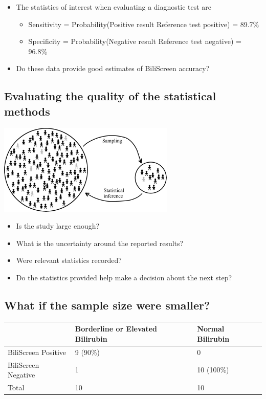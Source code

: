 \documentclass[
]{book}
\providecommand{\tightlist}{%
  \setlength{\itemsep}{0pt}\setlength{\parskip}{0pt}}
\begin{document}
\begin{itemize}
\tightlist
\item
  The statistics of interest when evaluating a diagnostic test are

  \begin{itemize}
  \tightlist
  \item
    Sensitivity = Probability(Positive result \textbar{} Reference test positive) = 89.7\%
  \item
    Specificity = Probability(Negative result \textbar{} Reference test negative) = 96.8\%
  \end{itemize}
\item
  Do these data provide good estimates of BiliScreen accuracy?
\end{itemize}

\hypertarget{evaluating-the-quality-of-the-statistical-methods}{%
\subsection{Evaluating the quality of the statistical methods}\label{evaluating-the-quality-of-the-statistical-methods}}

\includegraphics[width=0.5\linewidth]{./1_13}

\begin{itemize}
\tightlist
\item
  Is the study large enough?
\item
  What is the uncertainty around the reported results?
\item
  Were relevant statistics recorded?
\item
  Do the statistics provided help make a decision about the next step?
\end{itemize}

\hypertarget{what-if-the-sample-size-were-smaller}{%
\subsection{What if the sample size were smaller?}\label{what-if-the-sample-size-were-smaller}}

\begin{tabular}{l|l|l}
\hline
  & Borderline or Elevated Bilirubin & Normal Bilirubin\\
\hline
BiliScreen Positive & 9 (90\%) & 0\\
\hline
BiliScreen Negative & 1 & 10 (100\%)\\
\hline
Total & 10 & 10\\
\hline
\end{tabular}
\end{document}
